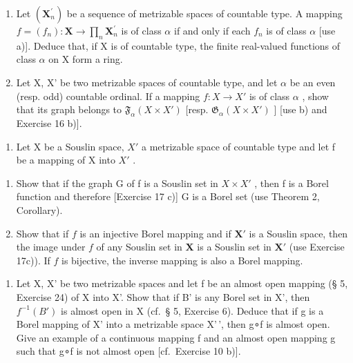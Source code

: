 \begin{enumerate}
\def\labelenumi{\alph{enumi})}
\setcounter{enumi}{1}
\item
  Let \((\mathbf{X}_{n}^{\prime})\) be a sequence of metrizable spaces of countable type. A mapping \(f = (f_{n}) : \mathbf{X} \to \prod_{n} \mathbf{X}_{n}^{\prime}\) is of class \(\alpha\) if and only if each \(f_{n}\) is of class \(\alpha\) {[}use a){]}. Deduce that, if X is of countable type, the finite real-valued functions of class \(\alpha\) on X form a ring.
\item
  Let X, X' be two metrizable spaces of countable type, and let \(\alpha\) be an even (resp. odd) countable ordinal. If a mapping \(f: X \to X'\) is of class \(\alpha\) , show that its graph belongs to \(\mathfrak{F}_{\alpha}(X \times X')\) {[}resp. \(\mathfrak{G}_{\alpha}(X \times X')\) {]} {[}use b) and Exercise 16 b){]}.
\end{enumerate}

\begin{enumerate}
\def\labelenumi{\arabic{enumi})}
\setcounter{enumi}{17}
\tightlist
\item
  Let X be a Souslin space, \(X'\) a metrizable space of countable type and let f be a mapping of X into \(X'\) .
\end{enumerate}

\begin{enumerate}
\def\labelenumi{\alph{enumi})}
\item
  Show that if the graph G of f is a Souslin set in \(X \times X'\) , then f is a Borel function and therefore {[}Exercise 17 c){]} G is a Borel set (use Theorem 2, Corollary).
\item
  Show that if \(f\) is an injective Borel mapping and if \(\mathbf{X}'\) is a Souslin space, then the image under \(f\) of any Souslin set in \(\mathbf{X}\) is a Souslin set in \(\mathbf{X}'\) (use Exercise 17c)). If \(f\) is bijective, the inverse mapping is also a Borel mapping.
\end{enumerate}

\begin{enumerate}
\def\labelenumi{\arabic{enumi})}
\setcounter{enumi}{18}
\tightlist
\item
  Let X, X' be two metrizable spaces and let f be an almost open mapping (§ 5, Exercise 24) of X into X'. Show that if B' is any Borel set in X', then \(f^{-1}(B')\) is almost open in X (cf.~§ 5, Exercise 6). Deduce that if g is a Borel mapping of X' into a metrizable space X'\,', then g∘f is almost open. Give an example of a continuous mapping f and an almost open mapping g such that g∘f is not almost open {[}cf.~Exercise 10 b){]}.
\end{enumerate}

